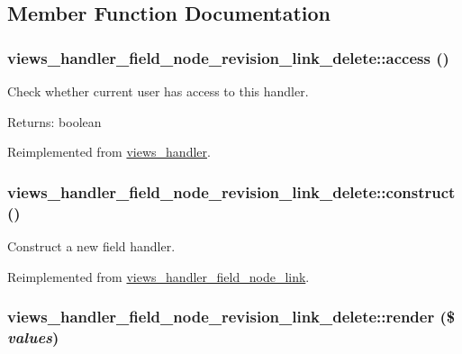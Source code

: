 \subsection{Member Function Documentation}
\hypertarget{classviews__handler__field__node__revision__link__delete_8d1e660c4945e837ced26d6f12a6521e}{
\subsubsection[{access}]{\setlength{\rightskip}{0pt plus 5cm}views\_\-handler\_\-field\_\-node\_\-revision\_\-link\_\-delete::access ()}}
\label{classviews__handler__field__node__revision__link__delete_8d1e660c4945e837ced26d6f12a6521e}


Check whether current user has access to this handler.

\begin{Desc}
\item[Returns:]boolean \end{Desc}


Reimplemented from \hyperlink{classviews__handler_3f2fbfe1e0849d06ae77149412b821f6}{views\_\-handler}.\hypertarget{classviews__handler__field__node__revision__link__delete_bec2f48d4827ff818da9c22716ccbd78}{
\subsubsection[{construct}]{\setlength{\rightskip}{0pt plus 5cm}views\_\-handler\_\-field\_\-node\_\-revision\_\-link\_\-delete::construct ()}}
\label{classviews__handler__field__node__revision__link__delete_bec2f48d4827ff818da9c22716ccbd78}


Construct a new field handler. 

Reimplemented from \hyperlink{classviews__handler__field__node__link_c3f643ba7dd0435fc03c7bf477907484}{views\_\-handler\_\-field\_\-node\_\-link}.\hypertarget{classviews__handler__field__node__revision__link__delete_366322147e080ffbfc7f427d2a522362}{
\subsubsection[{render}]{\setlength{\rightskip}{0pt plus 5cm}views\_\-handler\_\-field\_\-node\_\-revision\_\-link\_\-delete::render (\$ {\em values})}}
\label{classviews__handler__field__node__revision__link__delete_366322147e080ffbfc7f427d2a522362}


